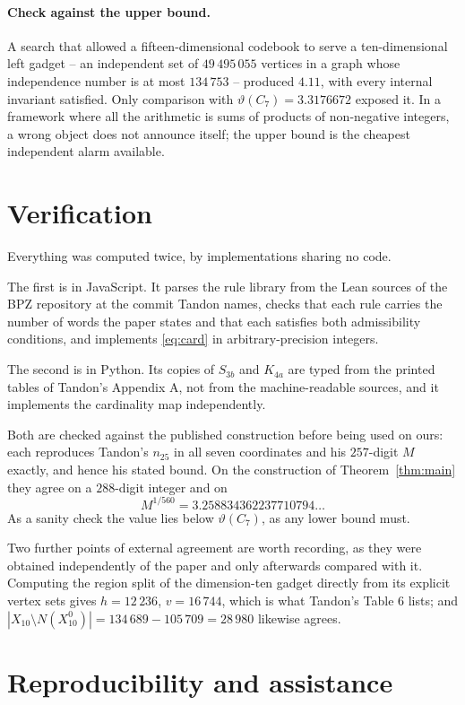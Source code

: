 \documentclass[11pt]{article}
\theoremstyle{definition}
\begin{document}
\paragraph{Check against the upper bound.}
A search that allowed a fifteen-dimensional codebook to serve a ten-dimensional left gadget --
an independent set of $49\,495\,055$ vertices in a graph whose independence number is at most
$134\,753$ -- produced $4.11$, with every internal invariant satisfied. Only comparison with
$\vartheta(C_7) = 3.3176672$ exposed it. In a framework where all the arithmetic is sums of
products of non-negative integers, a wrong object does not announce itself; the upper bound is the
cheapest independent alarm available.

\section{Verification}

Everything was computed twice, by implementations sharing no code.

The first is in JavaScript. It parses the rule library from the Lean sources of the BPZ
repository at the commit Tandon names, checks that each rule carries the number of words the paper
states and that each satisfies both admissibility conditions, and implements \eqref{eq:card} in
arbitrary-precision integers.

The second is in Python. Its copies of $S_{3b}$ and $K_{4a}$ are typed from the printed tables of
Tandon's Appendix A, not from the machine-readable sources, and it implements the cardinality map
independently.

Both are checked against the published construction before being used on ours: each reproduces
Tandon's $n_{25}$ in all seven coordinates and his $257$-digit $M$ exactly, and hence his stated
bound. On the construction of Theorem~\ref{thm:main} they agree on a $288$-digit integer and on
\[
  M^{1/560} = 3.258834362237710794\ldots
\]
As a sanity check the value lies below $\vartheta(C_7)$, as any lower bound must.

Two further points of external agreement are worth recording, as they were obtained
independently of the paper and only afterwards compared with it. Computing the region split of
the dimension-ten gadget directly from its explicit vertex sets gives $h = 12\,236$,
$v = 16\,744$, which is what Tandon's Table 6 lists; and $|X_{10} \setminus N(X^0_{10})| =
134\,689 - 105\,709 = 28\,980$ likewise agrees.

\section*{Reproducibility and assistance}
\end{document}
